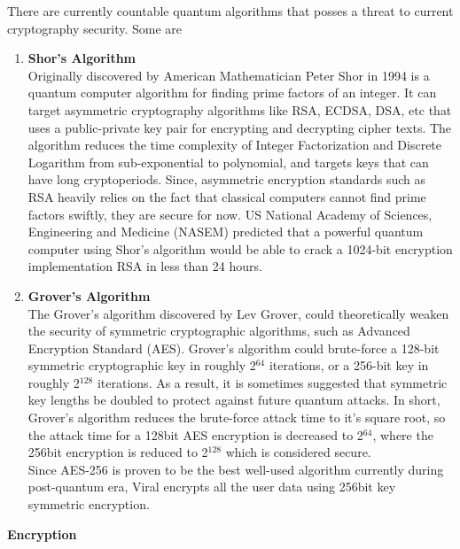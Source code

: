 \documentclass[conference]{IEEEtran}
\begin{document}
There are currently countable quantum algorithms that posses a threat to current cryptography security. Some are
\begin{enumerate}[wide, labelwidth=!, labelindent=0pt]
\item \textbf{Shor's Algorithm}\\

Originally discovered by American Mathematician Peter Shor in 1994 is a quantum computer algorithm for finding prime factors of an integer. It can target asymmetric cryptography algorithms like RSA, ECDSA, DSA, etc that uses a public-private key pair for encrypting and decrypting cipher texts. The algorithm reduces the time complexity of Integer Factorization and Discrete Logarithm from sub-exponential to polynomial, and targets keys that can have long cryptoperiods. Since, asymmetric encryption standards such as RSA heavily relies on the fact that classical computers cannot find prime factors swiftly, they are secure for now. US National Academy of Sciences, Engineering and Medicine (NASEM) predicted that a powerful quantum computer using Shor’s algorithm would be able to crack a 1024-bit encryption implementation RSA in less than 24 hours.\\

\item \textbf{Grover's Algorithm}\\

The Grover's algorithm discovered by Lev Grover, could theoretically weaken the security of symmetric cryptographic algorithms, such as Advanced Encryption Standard (AES). Grover's algorithm could brute-force a 128-bit symmetric cryptographic key in roughly 2$^{64}$ iterations, or a 256-bit key in roughly 2$^{128}$ iterations. As a result, it is sometimes suggested that symmetric key lengths be doubled to protect against future quantum attacks.  In short, Grover's algorithm reduces the brute-force attack time to it's square root, so the attack time for a 128bit AES encryption is decreased to 2$^{64}$, where the 256bit encryption is reduced to 2$^{128}$ which is considered secure.\\

Since AES-256 is proven to be the best well-used algorithm currently during post-quantum era, Viral encrypts all the user data using 256bit key symmetric encryption. \\
\end{enumerate}

\textbf{Encryption}\\
\end{document}

